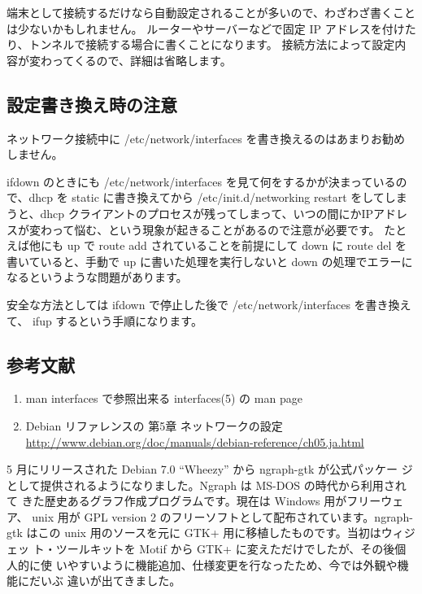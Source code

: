 \documentclass[mingoth,a4paper,twoside]{jsarticle}
\begin{document}
端末として接続するだけなら自動設定されることが多いので、わざわざ書くことは少ないかもしれません。
ルーターやサーバーなどで固定 IP アドレスを付けたり、トンネルで接続する場合に書くことになります。
接続方法によって設定内容が変わってくるので、詳細は省略します。

\subsection{設定書き換え時の注意}

ネットワーク接続中に /etc/network/interfaces を書き換えるのはあまりお勧めしません。

ifdown のときにも /etc/network/interfaces を見て何をするかが決まっているので、dhcp を static に書き換えてから /etc/init.d/networking restart をしてしまうと、dhcp クライアントのプロセスが残ってしまって、いつの間にかIPアドレスが変わって悩む、という現象が起きることがあるので注意が必要です。
たとえば他にも up で route add されていることを前提にして down に route del を書いていると、手動で up に書いた処理を実行しないと down の処理でエラーになるというような問題があります。

安全な方法としては ifdown で停止した後で /etc/network/interfaces を書き換えて、 ifup するという手順になります。

\subsection{参考文献}
\begin{enumerate}
\item %
  {\footnotesize{
      man interfaces で参照出来る interfaces(5) の man page
    }}
\item %
  {\footnotesize{
      Debian リファレンスの 第5章 ネットワークの設定 \url{http://www.debian.org/doc/manuals/debian-reference/ch05.ja.html}
    }}
\end{enumerate}

\pagebreak
\label{sec:ngraph}

5 月にリリースされた Debian 7.0 ``Wheezy'' から ngraph-gtk が公式パッケー
ジとして提供されるようになりました。Ngraph は MS-DOS の時代から利用されて
きた歴史あるグラフ作成プログラムです。現在は Windows 用がフリーウェア、
unix 用が GPL version 2 のフリーソフトとして配布されています。ngraph-gtk
はこの unix 用のソースを元に GTK+ 用に移植したものです。当初はウィジェッ
ト・ツールキットを Motif から GTK+ に変えただけでしたが、その後個人的に使
いやすいように機能追加、仕様変更を行なったため、今では外観や機能にだいぶ
違いが出てきました。
\end{document}

